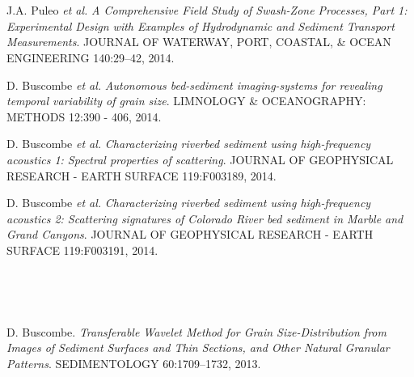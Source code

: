 \documentclass{article} %
\def\sf{\sffamily}
\def\sl{\slshape}
\newlength\sidebarwidth
\newcommand{\subtopic}[3][]
	 {\begin{minipage}{\textwidth}
	 \vspace*{.4\baselineskip}
         \nopagebreak\hspace{0in}%
         \nopagebreak\begin{minipage}[t]{\sidebarwidth - .2cm}
         \raggedleft {\sf\fontseries{sbc}\selectfont #2}
         {\\[-0.2\baselineskip] \textcolor{gray}{\footnotesize #1}}
	 \end{minipage}%
	 \hfill
	 \begin{minipage}[t]{\linewidth - \sidebarwidth}
	 #3%
	 \end{minipage}%
	 \vspace*{.2\baselineskip plus 1\baselineskip minus
	 .2\baselineskip}%
	 \end{minipage}}
\begin{document}
\subtopic{\hspace*{-3ex} 2014}{~
  \begin{itemize}[leftmargin=0ex, itemsep=0ex, parsep=.5ex, labelindent=-4ex]

    \publication
      J.A. Puleo {\sl et al.}
      {\sl A Comprehensive Field Study of Swash-Zone Processes, Part 1: Experimental Design with Examples of Hydrodynamic and Sediment Transport Measurements}.
      JOURNAL OF WATERWAY, PORT, COASTAL, \& OCEAN ENGINEERING 140:29–42, 2014.

    \publication
      D. Buscombe {\sl et al.}
      {\sl Autonomous bed-sediment imaging-systems for revealing temporal variability of grain size}.
      LIMNOLOGY \& OCEANOGRAPHY: METHODS 12:390 - 406, 2014.

    \publication
      D. Buscombe {\sl et al.}
      {\sl Characterizing riverbed sediment using high-frequency acoustics 1: Spectral properties of scattering}.
      JOURNAL OF GEOPHYSICAL RESEARCH - EARTH SURFACE 119:F003189, 2014.

    \publication
      D. Buscombe {\sl et al.}
      {\sl Characterizing riverbed sediment using high-frequency acoustics 2: Scattering signatures of Colorado River bed sediment in Marble and Grand Canyons}.
      JOURNAL OF GEOPHYSICAL RESEARCH - EARTH SURFACE 119:F003191, 2014.

    \end{itemize}
}

\subtopic{\hspace*{-3ex} 2013}{~
  \begin{itemize}[leftmargin=0ex, itemsep=0ex, parsep=.5ex, labelindent=-4ex]

    \publication
      D. Buscombe.
      {\sl Transferable Wavelet Method for Grain Size-Distribution from Images of Sediment Surfaces and Thin Sections, and Other Natural Granular Patterns}.
      SEDIMENTOLOGY 60:1709--1732, 2013.

    \end{itemize}
}
\end{document}
